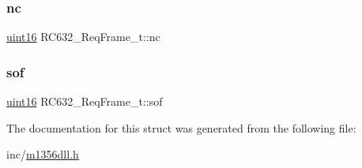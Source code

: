 \mbox{\label{struct_r_c632___req_frame__t_a09ca61a8ee262ee7c98669cd3226510b}} 
\subsubsection{\texorpdfstring{nc}{nc}}
{\footnotesize\ttfamily \mbox{\hyperlink{m1356dll_8h_a05f6b0ae8f6a6e135b0e290c25fe0e4e}{uint16}} R\+C632\+\_\+\+Req\+Frame\+\_\+t\+::nc}

\mbox{\label{struct_r_c632___req_frame__t_a737aa31dee20b759864099b808dbe156}} 
\subsubsection{\texorpdfstring{sof}{sof}}
{\footnotesize\ttfamily \mbox{\hyperlink{m1356dll_8h_a05f6b0ae8f6a6e135b0e290c25fe0e4e}{uint16}} R\+C632\+\_\+\+Req\+Frame\+\_\+t\+::sof}



The documentation for this struct was generated from the following file\+:\begin{DoxyCompactItemize}
\item 
inc/\mbox{\hyperlink{m1356dll_8h}{m1356dll.\+h}}\end{DoxyCompactItemize}
